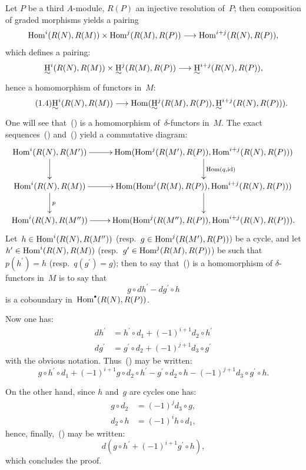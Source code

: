 Let $P$ be a third $A$-module, $R(P)$ an injective resolution of~$P$; then composition of graded morphisms yields a pairing
\begin{equation} \label{eq:V.10} \Hom^{i}(R(N), R(M))\times\Hom^{j}(R(M), R(P))\to\Hom^{i+j}(R(N), R(P)),
\end{equation}
which defines a pairing:
\begin{equation} \label{eq:V.11} \uH^{i}(R(N), R(M))\times\uH^{j}(R(M), R(P))\to\uH^{i+j}(R(N), R(P)),
\end{equation}
hence a homomorphism of functors in~$M$:
\begin{equation*} \label{eq:V.1.4} \tag{1.4} \uH^{i}(R(N), R(M))\to\Hom(\uH^{j}(R(M), R(P)), \uH^{i+j}(R(N), R(P))).
\end{equation*}
One will see that~() is a homomorphism of~$\delta$-functors in~$M$. The exact sequences~() and~() yield a commutative diagram:
$$
\xymatrix{ \Hom^{i}(R(N), R(M^{\prime}))\ar[r]\ar[d] & \Hom(\Hom^{j}(R(M^{\prime}), R(P)), \Hom^{i+j}(R(N), R(P)))\ar[d]^{\Hom(q, \id)}\\
\Hom^{i}(R(N), R(M))\ar[r]\ar[d]^{p} & \Hom(\Hom^{j}(R(M), R(P)), \Hom^{i+j}(R(N), R(P)))\ar[d]\\
\Hom^{i}(R(N), R(M^{\prime\prime}))\ar[r] & \Hom(\Hom^{j}(R(M^{\prime\prime}), R(P)), \Hom^{i+j}(R(N), R(P))).}$$
Let~$h\in\operatorname{Hom}^{i}(R(N), R(M^{\prime\prime}))$ (resp.\ $g\in\operatorname{Hom}^{j}(R(M^{\prime}), R(P))$) be a cycle, and let $h^{\prime}\in\operatorname{Hom}^{i}(R(N), R(M))$ (resp.\ $g^{\prime}\in\operatorname{Hom}^{j}(R(M), R(P))$) be such that~$p(h^{\prime})=h$ (resp.\ $q(g^{\prime})=g$); then to say that~() is a homomorphism of $\delta$-functors in~$M$ is to say that
\begin{equation} \label{eq:V.12}
g\circ dh^{\prime}-dg^{\prime}\circ h
\end{equation}
is a coboundary in~$\Hom^{\boule}(R(N), R(P))$.

Now one has:
\begin{align*}
dh^{\prime} &= h^{\prime}\circ d_{1}+(-1)^{i+1}d_{2}\circ h^{\prime}\\
dg^{\prime} &= g^{\prime}\circ d_{2}+(-1)^{j+1}d_{3}\circ g^{\prime}
\end{align*}
with the obvious notation. Thus~() may be written: \[
g\circ h^{\prime}\circ d_{1} + (-1)^{i+1}g\circ d_{2}\circ h^{\prime} -g^{\prime}\circ d_{2}\circ h - (-1)^{j+1}d_{3}\circ g^{\prime}\circ h.
\]

On the other hand, since $h$ and~$g$ are cycles one has:
\begin{align*}
g\circ d_{2} &= (-1)^{j}d_{3}\circ g, \\
d_{2}\circ h &= (-1)^{i}h\circ d_{1},
\end{align*}
hence, finally,~() may be written:
$$d(g\circ h^{\prime}+(-1)^{i+1}g^{\prime}\circ h),
$$
which concludes the proof.

